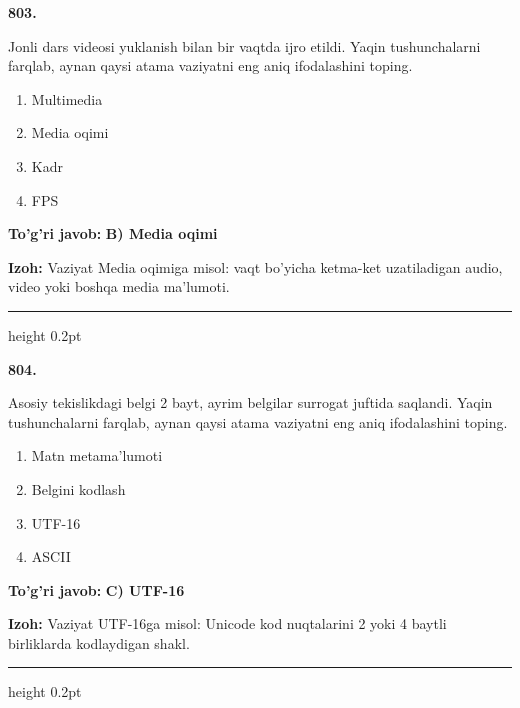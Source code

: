 \documentclass[10pt,a4paper,oneside]{article}
\begin{document}
\noindent\textbf{\color{ink}803.}
\par
Jonli dars videosi yuklanish bilan bir vaqtda ijro etildi. Yaqin tushunchalarni farqlab, aynan qaysi atama vaziyatni eng aniq ifodalashini toping.
\begin{enumerate}[label=\Alph*),leftmargin=9mm]
\item Multimedia
\item Media oqimi
\item Kadr
\item FPS
\end{enumerate}
\begin{tcolorbox}[enhanced,breakable,colback=teal!4,colframe=teal!50!black,boxrule=0.5pt,arc=1.1mm,left=3mm,right=3mm,top=1.7mm,bottom=1.7mm,before skip=2mm,after skip=2mm]
\textbf{\color{teal}To'g'ri javob:} \textbf{B) Media oqimi}
\par\smallskip
\textbf{Izoh:} Vaziyat Media oqimiga misol: vaqt bo'yicha ketma-ket uzatiladigan audio, video yoki boshqa media ma'lumoti.
\end{tcolorbox}
\vspace{2mm}\hrule height 0.2pt \vspace{3mm}

\noindent\textbf{\color{ink}804.}
\par
Asosiy tekislikdagi belgi 2 bayt, ayrim belgilar surrogat juftida saqlandi. Yaqin tushunchalarni farqlab, aynan qaysi atama vaziyatni eng aniq ifodalashini toping.
\begin{enumerate}[label=\Alph*),leftmargin=9mm]
\item Matn metama'lumoti
\item Belgini kodlash
\item UTF-16
\item ASCII
\end{enumerate}
\begin{tcolorbox}[enhanced,breakable,colback=teal!4,colframe=teal!50!black,boxrule=0.5pt,arc=1.1mm,left=3mm,right=3mm,top=1.7mm,bottom=1.7mm,before skip=2mm,after skip=2mm]
\textbf{\color{teal}To'g'ri javob:} \textbf{C) UTF-16}
\par\smallskip
\textbf{Izoh:} Vaziyat UTF-16ga misol: Unicode kod nuqtalarini 2 yoki 4 baytli birliklarda kodlaydigan shakl.
\end{tcolorbox}
\vspace{2mm}\hrule height 0.2pt \vspace{3mm}
\end{document}
